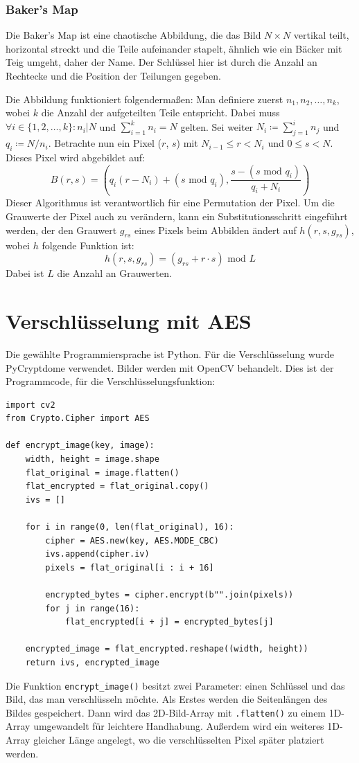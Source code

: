 \subsubsection{Baker's Map}\label{sec:bakersmap}
Die Baker's Map ist eine chaotische Abbildung, die das Bild $N \times N$ vertikal teilt, horizontal streckt und die Teile aufeinander stapelt, ähnlich
wie ein Bäcker mit Teig umgeht, daher der Name. Der Schlüssel hier ist durch die Anzahl an Rechtecke und die Position der Teilungen gegeben. \cite{chaos}

Die Abbildung funktioniert folgendermaßen: Man definiere zuerst $n_1, n_2, \dots , n_k$, wobei $k$ die Anzahl der aufgeteilten Teile entspricht.
Dabei muss $\forall i \in \{1, 2, \dots, k\} : n_i | N$ und $\sum_{i = 1}^{k} n_i = N$ gelten. Sei weiter $N_i \coloneq \sum_{j = 1}^{i} n_j$ und $q_i \coloneq N/n_i$.
Betrachte nun ein Pixel ($r$, $s$) mit $N_{i - 1} \leq r < N_i$ und $0 \leq s < N$. Dieses Pixel wird abgebildet auf:
$$B(r, s) =  (q_i(r - N_i) + (s \text{ mod } q_i), \frac{s - (s \text{ mod } q_i)}{q_i + N_i})$$
Dieser Algorithmus ist verantwortlich für eine Permutation der Pixel. Um die Grauwerte der Pixel auch zu verändern, kann ein Substitutionsschritt
eingeführt werden, der den Grauwert $g_{rs}$ eines Pixels beim Abbilden ändert auf $h(r, s, g_{rs})$, wobei $h$ folgende Funktion ist:
$$h(r, s, g_{rs}) = (g_{rs} + r \cdot s) \text{ mod } L$$
Dabei ist $L$ die Anzahl an Grauwerten.
\cite{chaos}

\section{Verschlüsselung mit AES}
Die gewählte Programmiersprache ist Python. Für die Verschlüsselung wurde PyCryptdome verwendet.
Bilder werden mit OpenCV behandelt.
Dies ist der Programmcode, für die Verschlüsselungsfunktion:
\begin{lstlisting}
import cv2
from Crypto.Cipher import AES

def encrypt_image(key, image):
    width, height = image.shape
    flat_original = image.flatten()
    flat_encrypted = flat_original.copy()
    ivs = []

    for i in range(0, len(flat_original), 16):
        cipher = AES.new(key, AES.MODE_CBC)
        ivs.append(cipher.iv)
        pixels = flat_original[i : i + 16]

        encrypted_bytes = cipher.encrypt(b"".join(pixels))
        for j in range(16):
            flat_encrypted[i + j] = encrypted_bytes[j]

    encrypted_image = flat_encrypted.reshape((width, height))
    return ivs, encrypted_image
\end{lstlisting}
Die Funktion \lstinline{encrypt_image()} besitzt zwei Parameter: einen Schlüssel und das Bild,
das man verschlüsseln möchte. Als Erstes werden die Seitenlängen des Bildes gespeichert. Dann wird das 2D-Bild-Array
mit \lstinline{.flatten()} zu einem 1D-Array umgewandelt für leichtere Handhabung. Außerdem wird ein weiteres 1D-Array
gleicher Länge angelegt, wo die verschlüsselten Pixel später platziert werden.

